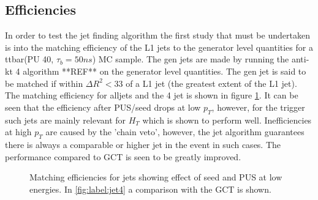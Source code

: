 \subsection{Efficiencies}
In order to test the jet finding algorithm the first study that must be undertaken is into the matching efficiency of the L1 jets to the generator level quantities for a ttbar(PU 40, $\tau_b=50ns$) MC sample. The gen jets are made by running the anti-kt 4 algorithm **REF** on the generator level quantities. The gen jet is said to be matched if within ${\Delta R}^2<33$ of a L1 jet (the greatest extent of the L1 jet). The matching efficiency for alljets and the 4 jet is shown in figure \ref{match}. It can be seen that the efficiency after PUS/seed drops at low $p_T$, however, for the trigger such jets are mainly relevant for $H_T$ which is shown to perform well. Inefficiencies at high $p_T$ are caused by the 'chain veto', however, the jet algorithm guarantees there is always a comparable or higher jet in the event in such cases. The performance compared to GCT is seen to be greatly improved.  
\begin{figure}
\hfill
{}
\hfill
{}
\hfill
\caption{Matching efficiencies for jets showing effect of seed and PUS at low energies. In \ref{fig:label:jet4} a comparison with the GCT is shown.}
\label{match}
\end{figure}
